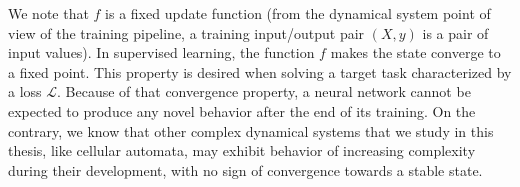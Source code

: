 We note that $f$ is a fixed update function (from the dynamical system point of
view of the training pipeline, a training input/output pair $(X, y)$ is a pair
of input values). In supervised learning, the function $f$ makes the state
converge to a fixed point. This property is desired when solving a target task
characterized by a loss $\mathcal{L}$. Because of that convergence property, a neural
network cannot be expected to produce any novel behavior after the end of its
training. On the contrary, we know that other complex dynamical systems that we
study in this thesis, like cellular automata, may exhibit behavior of increasing
complexity during their development, with no sign of convergence towards a
stable state.
